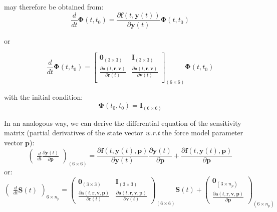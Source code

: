 may therefore be obtained from:
\begin{equation}
  \frac{d}{dt}\bm{\Phi}(t,t_0) = 
    \frac{\partial \bm{f}(t,\bm{y}(t))}{\partial \bm{y}(t)}
      \bm{\Phi}(t,t_0)
\end{equation}

or

\begin{equation}
  \frac{d}{dt}\bm{\Phi}(t,t_0) = 
  \begin{bmatrix}
    \bm{0}_{(3 \times 3)} & \bm{I}_{(3 \times 3)} \\
    \frac{\partial \bm{a}(t,\bm{r},\bm{v})}{\partial \bm{r}(t)} &
      \frac{\partial \bm{a}(t,\bm{r},\bm{v})}{\partial \bm{v}(t)} \\
  \end{bmatrix}_{(6 \times 6)}
  \bm{\Phi}(t,t_0)
\end{equation}

with the initial condition:
\begin{equation}
  \bm{\Phi}(t_0,t_0) = \bm{I}_{(6 \times 6)}
\end{equation}

In an analogous way, we can derive the differential equation of the sensitivity 
matrix (partial derivatives of the state vector \emph{w.r.t} the force model 
parameter vector $\bm{p}$):
\begin{equation}
  \begin{pmatrix} \frac{d}{dt} \frac{\partial \bm{y}(t)}{\partial \bm{p}} 
    \end{pmatrix}_{(6 \times 6)} = 
  \frac{\partial \bm{f}(t,\bm{y}(t), \bm{p})}{\partial \bm{y}(t)} 
      \frac{\partial \bm{y}(t)}{\partial \bm{p}} + 
      \frac{\partial \bm{f}(t,\bm{y}(t), \bm{p})}{\partial \bm{p}}
\end{equation}
or:
\begin{equation}
  \begin{pmatrix} \frac{d}{dt}\bm{S}(t) \end{pmatrix}_{6 \times n_p} = 
    \begin{pmatrix}
      \bm{0}_{(3 \times 3)} & \bm{I}_{(3 \times 3)} \\
      \frac{\partial \bm{a}(t,\bm{r},\bm{v},\bm{p})}{\partial \bm{r}(t)} &
      \frac{\partial \bm{a}(t,\bm{r},\bm{v},\bm{p})}{\partial \bm{v}(t)}
   \end{pmatrix}_{(6 \times 6)}
    \bm{S}(t) + 
   \begin{pmatrix}
      \bm{0}_{(3 \times n_p)} \\
      \frac{\partial \bm{a}(t,\bm{r},\bm{v},\bm{p})}{\partial \bm{p}}
   \end{pmatrix}_{(6 \times n_p)}
\end{equation}

